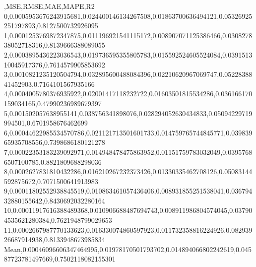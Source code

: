 ,MSE,RMSE,MAE,MAPE,R2
0,0.0005953676243915681,0.024400146134267508,0.01863700636494121,0.05326925251797893,0.8127500732926095
1,0.0001253769872347875,0.011196921541115172,0.008907071125386466,0.030827838052718316,0.8139666388089055
2,0.0003895436223036543,0.019736595355805783,0.015592524605524084,0.039151310045917376,0.7614579905853692
3,0.0010821235120504794,0.032895600488084396,0.02210620967069747,0.0522838841452903,0.7164101567935166
4,0.0004005780376935922,0.02001417118232722,0.01603501815534286,0.036166170159034165,0.47990236989679397
5,0.001502057638955141,0.038756341898076,0.028294052630434833,0.05094229719994501,0.6701958676462699
6,0.00044622985534570786,0.021121713501601733,0.014759765744845771,0.03983965935708556,0.7398686180121278
7,0.00022353183239092971,0.014948478475863952,0.01151759783032049,0.03957686507100785,0.8821809688298036
8,0.0002627831810432286,0.016210267232373426,0.01330335462708126,0.05083144592875672,0.7071500641913983
9,0.00011802552938845519,0.010863461057436406,0.008931855251538041,0.03679432880155642,0.8430692032280164
10,0.00011917616388489368,0.010906688487694743,0.008911986804574045,0.037904535621280384,0.7621948799029653
11,0.0002667987770133623,0.016330074860597923,0.011732358816224926,0.08293926687914938,0.8133948673985834
Mean,0.00046096606347464995,0.01978170501793702,0.014894066802242619,0.04587723781497669,0.7502118082155301
